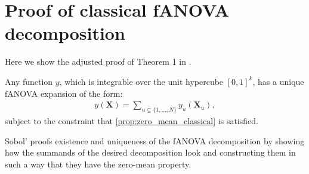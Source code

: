 \section*{Proof of classical fANOVA decomposition}
Here we show the adjusted proof of Theorem 1 in \cite{sobol1993sensitivity}.
\begin{theorem}
    Any function $y$, which is integrable over the unit hypercube $[0, 1]^k$, has a unique fANOVA expansion of the form:
    \begin{align*}
        y(\boldsymbol{X}) = \sum_{u \subseteq \{1, \dots, N\}} y_{u}(\boldsymbol{X}_u),
    \end{align*}
    subject to the constraint that \autoref{prop:zero_mean_classical} is satisfied.
\end{theorem}
Sobol' proofs existence and uniqueness of the fANOVA decomposition by showing how the summands of the desired decomposition look and constructing them in such a way that they have the zero-mean property.

